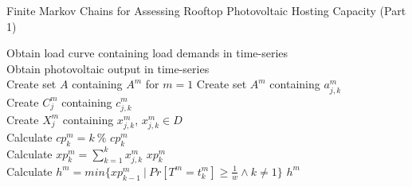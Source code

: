 \bgroup
\begin{algorithm}[htbp]
	\caption{Finite Markov Chains for Assessing Rooftop Photovoltaic Hosting Capacity (Part 1)}\label{alg:marchai1}
	\begin{algorithmic}[1]
		\State Obtain load curve containing load demands in time-series
		\EndProcedure \\
		
		\State Obtain photovoltaic output in time-series
		\EndProcedure \\	
		
		\State Create set $A$ containing $A^m$ for $m=1$
		\State Create set $A^m$ containing $a^m_{j,k}$
		\EndProcedure \\
		
		\State Create $\mathit{C^m_j}$ containing $c^m_{j,k}$
		\EndProcedure\\
		
		\State Create $\mathit{X^m_j}$ containing $x^m_{j,k}$, $x^m_{j,k} \in \mathit{D}$
		\EndProcedure \\
		
		\State Calculate $cp^m_k=k\ \%$
		\State\Return $cp^m_k$
		\EndFunction \\
		
		\State Calculate $xp^m_k=\sum_{k=1}^k x^m_{j,k}$
		\State\Return $xp^m_k$
		\EndFunction \\
		
		\State Calculate $\mathit{h^m}=min\big\{\mathit{xp^m_{k-\text{1}}}\ |\ Pr[T^m=\mathit{t^m_k}]\geq \frac{1}{w}\wedge k\neq 1\big\}$
		\State\Return $\mathit{h^m}$
		\EndFunction	
\end{algorithmic}
\end{algorithm}
\addtocounter{algorithm}{-1}
